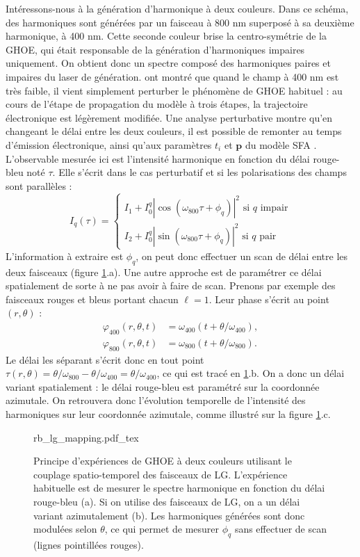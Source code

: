 Intéressons-nous à la génération d'harmonique à deux couleurs. Dans ce schéma, des harmoniques sont générées par un faisceau à 800 nm superposé à sa deuxième harmonique, à 400 nm. Cette seconde couleur brise la centro-symétrie de la GHOE, qui était responsable de la génération d'harmoniques impaires uniquement. On obtient donc un spectre composé des harmoniques paires et impaires du laser de génération.  ont montré que quand le champ à 400 nm est très faible, il vient simplement perturber le phénomène de GHOE habituel : au cours de l'étape de propagation du modèle à trois étapes, la trajectoire électronique est légèrement modifiée. Une analyse perturbative montre qu'en changeant le délai entre les deux couleurs, il est possible de remonter au temps d'émission électronique, ainsi qu'aux paramètres $t_i$ et $\bm{p}$ du modèle SFA . L'observable mesurée ici est l'intensité harmonique en fonction du délai rouge-bleu noté $\tau$. Elle s'écrit dans le cas perturbatif et si les polarisations des champs sont parallèles :
\begin{equation}
I_q(\tau)=
\begin{cases}
I_1 + I^q_0\left|\cos(\omega_{800}\tau+\phi_q)\right|^2\text{ si $q$ impair}\\
I_2 + I^q_0\left|\sin(\omega_{800}\tau+\phi_q)\right|^2\text{ si $q$ pair}
\end{cases}
\label{eq:oren}
\end{equation}
L'information à extraire est $\phi_q$, on peut donc effectuer un scan de délai entre les deux faisceaux (figure \ref{fig:rb_mapping}.a). Une autre approche est de paramétrer ce délai spatialement de sorte à ne pas avoir à faire de scan. Prenons par exemple des faisceaux rouges et bleus portant chacun $\ell=1$. Leur phase s'écrit au point $(r,\theta)$ :
\begin{align}
\varphi_{400}(r,\theta,t) &= \omega_{400}(t + \theta/\omega_{400}),\\
\varphi_{800}(r,\theta,t) &= \omega_{800}(t + \theta/\omega_{800}).
\end{align}
Le délai les séparant s'écrit donc en tout point $\tau(r,\theta) = \theta/\omega_{800}-\theta/\omega_{400} = \theta/\omega_{400}$, ce qui est tracé en \ref{fig:rb_mapping}.b. On a donc un délai variant spatialement : le délai rouge-bleu est paramétré sur la coordonnée azimutale. On retrouvera donc l'évolution temporelle de l'intensité des harmoniques sur leur coordonnée azimutale, comme illustré sur la figure \ref{fig:rb_mapping}.c.
\begin{figure}[!ht]
\centering
\def\svgwidth{\columnwidth}
{rb_lg_mapping.pdf_tex}
\caption{Principe d'expériences de GHOE à deux couleurs utilisant le couplage spatio-temporel des faisceaux de LG. L'expérience habituelle est de mesurer le spectre harmonique en fonction du délai rouge-bleu (a). Si on utilise des faisceaux de LG, on a un délai variant azimutalement (b). Les harmoniques générées sont donc modulées selon $\theta$, ce qui permet de mesurer $\phi_q$ sans effectuer de scan (lignes pointillées rouges).}
\label{fig:rb_mapping}
\end{figure}
